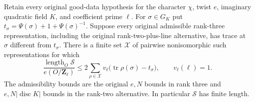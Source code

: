 \begin{corollary}
\label{cor:support-one-character-trace}
Retain every original good-data hypothesis for the character $\chi$,
twist $e$, imaginary quadratic field $K$, and coefficient prime
$\ell$.  For $\sigma\in G_K$ put
$t_\sigma=\Psi(\sigma)+1+\Psi(\sigma)^{-1}$.
Suppose every original admissible rank-three representation, including
the original rank-two-plus-line alternative, has trace at $\sigma$
different from $t_\sigma$.  There is a finite set $\mathcal X$ of
pairwise nonisomorphic such representations for which
\[
 \frac{\operatorname{length}_O\mathcal S}
      {e(O/\mathbf Z_\ell)}
 \le 2\sum_{\rho\in\mathcal X}
       v_\ell\bigl(\operatorname{tr}\rho(\sigma)-t_\sigma\bigr),
 \qquad v_\ell(\ell)=1.                                     \tag{LC11}
\]
The admissibility bounds are the original $e,N$ bounds in rank
three and $e,N|\operatorname{disc}K|$ bounds in the rank-two
alternative.  In particular $\mathcal S$ has finite length.
\end{corollary}


